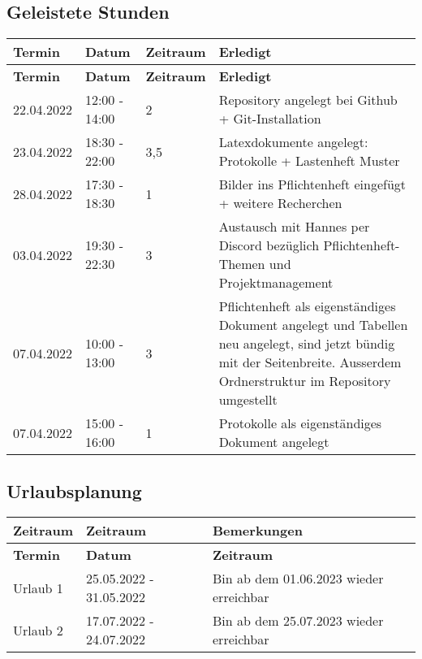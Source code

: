 \subsection{Geleistete Stunden}
\begin{flushleft}
		\begin{longtable}{p{2cm}p{}p{2cm}p{}}
            \toprule
            \textbf{Termin} & \textbf{Datum} & \textbf{Zeitraum} & \textbf{Erledigt}\\
            \midrule\endfirsthead
            \toprule
            \textbf{Termin} & \textbf{Datum} & \textbf{Zeitraum} & \textbf{Erledigt}\\
            \midrule\endhead
            	22.04.2022 & 12:00 - 14:00 & 2 & Repository angelegt bei Github +  Git-Installation\\ \midrule
    			23.04.2022 & 18:30 - 22:00 & 3,5 & Latexdokumente angelegt: Protokolle + Lastenheft Muster \\ \midrule
			    28.04.2022 & 17:30 - 18:30 & 1 & Bilder ins Pflichtenheft eingefügt + weitere Recherchen\\ \midrule
				03.04.2022 & 19:30 - 22:30 & 3 & Austausch mit Hannes per Discord bezüglich Pflichtenheft-Themen und Projektmanagement\\ \midrule
				07.04.2022 & 10:00 - 13:00 & 3 & Pflichtenheft als eigenständiges Dokument angelegt und Tabellen neu angelegt, sind jetzt bündig mit der Seitenbreite. Ausserdem Ordnerstruktur im Repository umgestellt\\ \midrule
				07.04.2022 & 15:00 - 16:00 & 1 & Protokolle als eigenständiges Dokument angelegt \\ 
            \bottomrule
    \end{longtable}
\end{flushleft}

\subsection{Urlaubsplanung}

\begin{flushleft}
		\begin{longtable}{p{3cm}p{5cm}p{9cm}}
            \toprule
            \textbf{Zeitraum} & \textbf{Zeitraum}& \textbf{Bemerkungen} \\
            \midrule\endfirsthead
            \toprule
            \textbf{Termin} & \textbf{Datum} & \textbf{Zeitraum}\\
            \midrule\endhead
            	Urlaub 1 & 25.05.2022 - 31.05.2022 & Bin ab dem 01.06.2023 wieder erreichbar  \\ \midrule
				Urlaub 2 & 17.07.2022 - 24.07.2022 & Bin ab dem 25.07.2023 wieder erreichbar \\
            \bottomrule
    \end{longtable}
\end{flushleft}